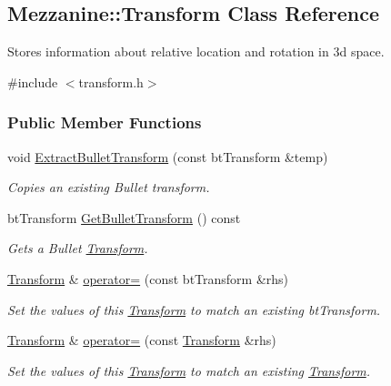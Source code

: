 \hypertarget{classMezzanine_1_1Transform}{
\subsection{Mezzanine::Transform Class Reference}
\label{classMezzanine_1_1Transform}
}


Stores information about relative location and rotation in 3d space.  




{\ttfamily \#include $<$transform.h$>$}

\subsubsection*{Public Member Functions}
\begin{DoxyCompactItemize}
\item 
void \hyperlink{classMezzanine_1_1Transform_ade790a95db2817427aea8b7a90f95925}{ExtractBulletTransform} (const btTransform \&temp)
\begin{DoxyCompactList}\small\item\em Copies an existing Bullet transform. \item\end{DoxyCompactList}\item 
btTransform \hyperlink{classMezzanine_1_1Transform_ae1745852b61f7388a5374eeebdc893cd}{GetBulletTransform} () const 
\begin{DoxyCompactList}\small\item\em Gets a Bullet \hyperlink{classMezzanine_1_1Transform}{Transform}. \item\end{DoxyCompactList}\item 
\hyperlink{classMezzanine_1_1Transform}{Transform} \& \hyperlink{classMezzanine_1_1Transform_a4ea68563eacb2f69a4e83a0c28392b74}{operator=} (const btTransform \&rhs)
\begin{DoxyCompactList}\small\item\em Set the values of this \hyperlink{classMezzanine_1_1Transform}{Transform} to match an existing btTransform. \item\end{DoxyCompactList}\item 
\hyperlink{classMezzanine_1_1Transform}{Transform} \& \hyperlink{classMezzanine_1_1Transform_aa21521163611bf58988caf99c085d067}{operator=} (const \hyperlink{classMezzanine_1_1Transform}{Transform} \&rhs)
\begin{DoxyCompactList}\small\item\em Set the values of this \hyperlink{classMezzanine_1_1Transform}{Transform} to match an existing \hyperlink{classMezzanine_1_1Transform}{Transform}. \item\end{DoxyCompactList}\item 

\end{DoxyCompactItemize}
